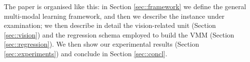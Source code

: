 The paper is organised like this: in Section \ref{sec::framework} we define the general
multi-modal learning framework, and then we describe the instance under examination;
we then describe in detail the vision-related unit (Section \ref{sec::vision}) and the
regression schema employed to build the VMM (Section \ref{sec::regression}). We then show our
experimental results (Section \ref{sec::experiments}) and conclude in Section \ref{sec::concl}.

%
%
%
%
%
%
%
